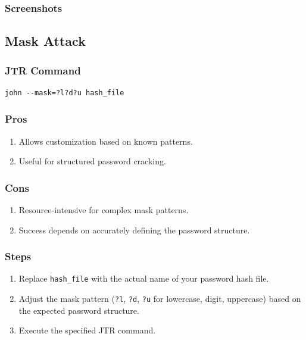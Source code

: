 \documentclass[11pt]{article}
\begin{document}
\subsubsection{Screenshots}

\subsection{Mask Attack}

\subsubsection{JTR Command}

\begin{verbatim}
john --mask=?l?d?u hash_file
\end{verbatim}

\subsubsection{Pros}

\begin{enumerate}
    \item Allows customization based on known patterns.
    \item Useful for structured password cracking.
\end{enumerate}

\subsubsection{Cons}

\begin{enumerate}
    \item Resource-intensive for complex mask patterns.
    \item Success depends on accurately defining the password structure.
\end{enumerate}

\subsubsection{Steps}

\begin{enumerate}
    \item Replace \texttt{hash\_file} with the actual name of your password hash file.
    \item Adjust the mask pattern (\texttt{?l}, \texttt{?d}, \texttt{?u} for lowercase, digit, uppercase) based on the expected password structure.
    \item Execute the specified JTR command.
\end{enumerate}
\end{document}
